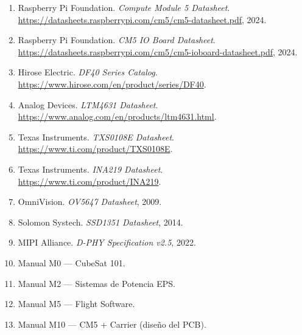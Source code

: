 \documentclass[11pt,a4paper,oneside,openright]{book}
\begin{document}
\begin{enumerate}[leftmargin=2em]
\item Raspberry Pi Foundation. \emph{Compute Module 5 Datasheet}. \\
  \url{https://datasheets.raspberrypi.com/cm5/cm5-datasheet.pdf}, 2024.
\item Raspberry Pi Foundation. \emph{CM5 IO Board Datasheet}. \\
  \url{https://datasheets.raspberrypi.com/cm5/cm5-ioboard-datasheet.pdf}, 2024.
\item Hirose Electric. \emph{DF40 Series Catalog}. \\
  \url{https://www.hirose.com/en/product/series/DF40}.
\item Analog Devices. \emph{LTM4631 Datasheet}. \\
  \url{https://www.analog.com/en/products/ltm4631.html}.
\item Texas Instruments. \emph{TXS0108E Datasheet}. \\
  \url{https://www.ti.com/product/TXS0108E}.
\item Texas Instruments. \emph{INA219 Datasheet}. \\
  \url{https://www.ti.com/product/INA219}.
\item OmniVision. \emph{OV5647 Datasheet}, 2009.
\item Solomon Systech. \emph{SSD1351 Datasheet}, 2014.
\item MIPI Alliance. \emph{D-PHY Specification v2.5}, 2022.
\item Manual M0 --- CubeSat 101.
\item Manual M2 --- Sistemas de Potencia EPS.
\item Manual M5 --- Flight Software.
\item Manual M10 --- CM5 + Carrier (diseño del PCB).
\end{enumerate}
\end{document}
